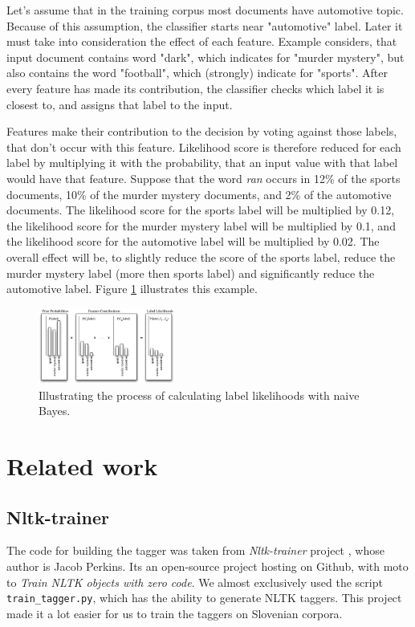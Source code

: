 \documentclass[10pt, conference, compsocconf]{IEEEtran}
\begin{document}
Let's assume that in the training corpus most documents have automotive topic. Because of this assumption, the classifier starts near "automotive" label. Later it must take into consideration the effect of each feature. Example considers, that input document contains word "dark", which indicates for "murder mystery", but also contains the word "football", which (strongly) indicate for "sports". After every feature has made its contribution, the classifier checks which label it is closest to, and assigns that label to the input.

Features make their contribution to the decision by voting against those labels, that don't occur with this feature. Likelihood score is therefore reduced for each label by multiplying it with the probability, that an input value with that label would have that feature. Suppose that the word \textit{ran} occurs in  12\% of the sports documents, 10\% of the murder mystery documents, and 2\% of the automotive documents. The likelihood score for the sports label will be multiplied by 0.12, the likelihood score for the murder mystery label will be multiplied by 0.1, and the likelihood score for the automotive label will be multiplied by 0.02. The overall effect will be, to slightly reduce the score of the sports label, reduce the murder mystery label (more then sports label) and significantly reduce the automotive label. Figure \ref{fig:naive-bayes-bargraph} illustrates this example.

\begin{figure}[htb]
\begin{center}
\includegraphics[width=0.4\textwidth]{naive_bayes_bargraph.png} 
\end{center}
\caption{Illustrating the process of calculating label likelihoods with naive Bayes.}
\label{fig:naive-bayes-bargraph}
\end{figure}

\section{Related work}
\label{relatedWork}
\subsection{Nltk-trainer} %
The code for building the tagger was taken from \textit{Nltk-trainer}  project \cite{nltk-trainer}, whose author is Jacob Perkins.
Its an open-source project hosting on Github, with moto to \textit{Train NLTK objects with zero code}.
We almost exclusively used the script \texttt{train\_tagger.py}, which has the ability to generate NLTK taggers. This project made it a lot easier for us to train the taggers on Slovenian corpora.
\end{document}
